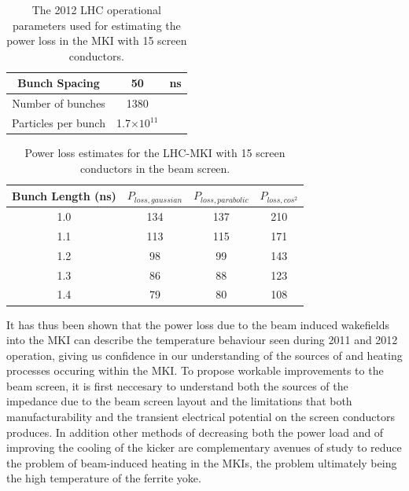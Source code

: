 \begin{table}
\caption{The 2012 LHC operational parameters used for estimating the power loss in the MKI with 15 screen conductors.}
\label{tab:mki-beam-parameters}
\begin{center}
\begin{tabular}{c | c | c}
Bunch Spacing & 50 & ns \\ \hline
Number of bunches & 1380 & \\ \hline
Particles per bunch & 1.7$\times 10^{11}$ & \\
\end{tabular}
\end{center}
\end{table}

\begin{table}
\caption{Power loss estimates for the LHC-MKI with 15 screen conductors in the beam screen.}
\label{tab:mki-15-heating}
\begin{center}
\begin{tabular}{c | c | c | c}
Bunch Length (ns) & $P_{loss, gaussian}$ & $P_{loss, parabolic}$ & $P_{loss, cos^{2}}$ \\ \hline
1.0 & 134 & 137 & 210 \\ \hline
1.1 & 113 & 115 & 171 \\ \hline
1.2 & 98 & 99 & 143 \\ \hline
1.3 & 86 & 88 & 123 \\ \hline
1.4 & 79 & 80 & 108 \\ \hline
\end{tabular}
\end{center}
\end{table}

It has thus been shown that the power loss due to the beam induced wakefields into the MKI can describe the temperature behaviour seen during 2011 and 2012 operation, giving us confidence in our understanding of the sources of and heating processes occuring within the MKI. To propose workable improvements to the beam screen, it is first neccesary to understand both the sources of the impedance due to the beam screen layout and the limitations that both manufacturability and the transient electrical potential on the screen conductors produces. In addition other methods of decreasing both the power load and of improving the cooling of the kicker are complementary avenues of study to reduce the problem of beam-induced heating in the MKIs, the problem ultimately being the high temperature of the ferrite yoke.

